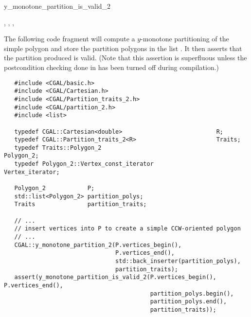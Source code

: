 \begin{ccRefFunction}{y_monotone_partition_is_valid_2}
\ccSeeAlso

,
,
,

\ccExample

The following code fragment will compute a $y$-monotone
partitioning of the simple polygon  
and store the partition polygons in the list .
It then asserts that the partition produced is valid.
(Note that this assertion is superfluous unless the postcondition checking
done in  has been turned off during
compilation.)

\begin{verbatim}
   #include <CGAL/basic.h>
   #include <CGAL/Cartesian.h>
   #include <CGAL/Partition_traits_2.h>
   #include <CGAL/partition_2.h>
   #include <list>

   typedef CGAL::Cartesian<double>                           R;
   typedef CGAL::Partition_traits_2<R>                       Traits;
   typedef Traits::Polygon_2                                 Polygon_2;
   typedef Polygon_2::Vertex_const_iterator                  Vertex_iterator;

   Polygon_2            P;
   std::list<Polygon_2> partition_polys;
   Traits               partition_traits;

   // ...
   // insert vertices into P to create a simple CCW-oriented polygon
   // ...
   CGAL::y_monotone_partition_2(P.vertices_begin(),
                                P.vertices_end(),
                                std::back_inserter(partition_polys),
                                partition_traits);
   assert(y_monotone_partition_is_valid_2(P.vertices_begin(), P.vertices_end(),
                                          partition_polys.begin(), 
                                          partition_polys.end(),
                                          partition_traits));
\end{verbatim}

\end{ccRefFunction}
\renewcommand\ccRefPageBegin{\ccParDims\cgalColumnLayout}
\renewcommand\ccRefPageEnd{\ccParDims\cgalColumnLayout}
